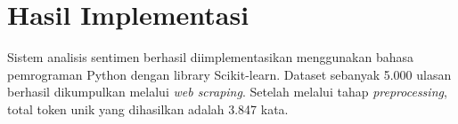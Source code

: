 \section{Hasil Implementasi}

Sistem analisis sentimen berhasil diimplementasikan menggunakan bahasa pemrograman Python dengan library Scikit-learn. Dataset sebanyak 5.000 ulasan berhasil dikumpulkan melalui \emph{web scraping}. Setelah melalui tahap \emph{preprocessing}, total token unik yang dihasilkan adalah 3.847 kata.
